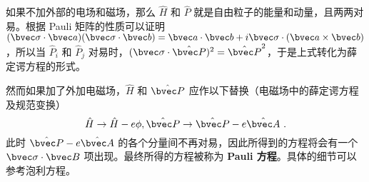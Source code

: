 如果不加外部的电场和磁场，那么 $\hat H$ 和 $\hat P$ 就是自由粒子的能量和动量，且两两对易。根据 Pauli 矩阵的性质可以证明 $(\bvec \sigma\cdot \bvec a)(\bvec \sigma\cdot \bvec b)=\bvec a\cdot \bvec b+i\bvec \sigma\cdot (\bvec a\times \bvec b)$，所以当 $\hat P_i$ 和 $\hat P_j$ 对易时，$(\bvec \sigma\cdot \hat{\bvec P})^2=\hat{\bvec P}^2$，于是上式转化为薛定谔方程的形式。

然而如果加了外加电磁场，$\hat H$ 和 $\hat{\bvec P}$ 应作以下替换（电磁场中的薛定谔方程及规范变换）
\begin{equation}
\hat H\rightarrow \hat H-e\phi, \hat{\bvec P}\rightarrow \hat{\bvec P}-e\hat{\bvec A}~.
\end{equation}
此时 $\hat{\bvec P}-e\hat{\bvec A}$ 的各个分量间不再对易，因此所得到的方程将会有一个 $\bvec \sigma\cdot \bvec B$ 项出现。最终所得的方程被称为 \textbf{Pauli 方程}。具体的细节可以参考泡利方程。
